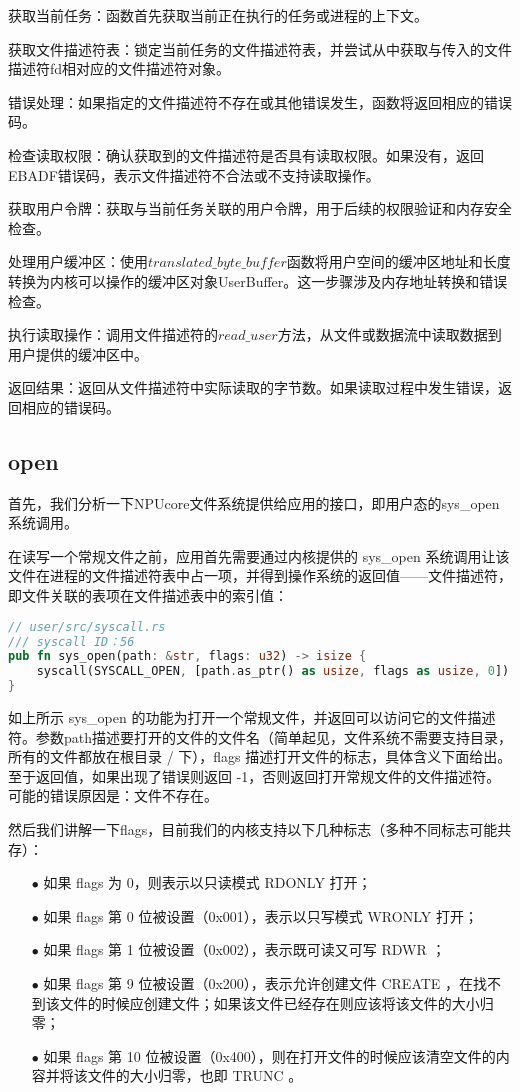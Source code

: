 获取当前任务：函数首先获取当前正在执行的任务或进程的上下文。

获取文件描述符表：锁定当前任务的文件描述符表，并尝试从中获取与传入的文件描述符fd相对应的文件描述符对象。

错误处理：如果指定的文件描述符不存在或其他错误发生，函数将返回相应的错误码。

检查读取权限：确认获取到的文件描述符是否具有读取权限。如果没有，返回EBADF错误码，表示文件描述符不合法或不支持读取操作。

获取用户令牌：获取与当前任务关联的用户令牌，用于后续的权限验证和内存安全检查。

处理用户缓冲区：使用$translated\_byte\_buffer$函数将用户空间的缓冲区地址和长度转换为内核可以操作的缓冲区对象UserBuffer。这一步骤涉及内存地址转换和错误检查。

执行读取操作：调用文件描述符的$read\_user$方法，从文件或数据流中读取数据到用户提供的缓冲区中。

返回结果：返回从文件描述符中实际读取的字节数。如果读取过程中发生错误，返回相应的错误码。

\subsection{open}
首先，我们分析一下NPUcore文件系统提供给应用的接口，即用户态的sys_open 系统调用。

在读写一个常规文件之前，应用首先需要通过内核提供的 sys_open 系统调用让该文件在进程的文件描述符表中占一项，并得到操作系统的返回值——文件描述符，即文件关联的表项在文件描述表中的索引值：
\begin{lstlisting}[language=rust]
// user/src/syscall.rs
/// syscall ID：56
pub fn sys_open(path: &str, flags: u32) -> isize {
	syscall(SYSCALL_OPEN, [path.as_ptr() as usize, flags as usize, 0])
}
\end{lstlisting}

如上所示 sys_open 的功能为打开一个常规文件，并返回可以访问它的文件描述符。参数path描述要打开的文件的文件名（简单起见，文件系统不需要支持目录，所有的文件都放在根目录 / 下），flags 描述打开文件的标志，具体含义下面给出。至于返回值，如果出现了错误则返回 -1，否则返回打开常规文件的文件描述符。可能的错误原因是：文件不存在。

然后我们讲解一下flags，目前我们的内核支持以下几种标志（多种不同标志可能共存）：
\begin{itemize}
\item [$\bullet$]
如果 flags 为 0，则表示以只读模式 RDONLY 打开；
\item [$\bullet$]
如果 flags 第 0 位被设置（0x001），表示以只写模式 WRONLY 打开；
\item [$\bullet$]
如果 flags 第 1 位被设置（0x002），表示既可读又可写 RDWR ；
\item [$\bullet$]
如果 flags 第 9 位被设置（0x200），表示允许创建文件 CREATE ，在找不到该文件的时候应创建文件；如果该文件已经存在则应该将该文件的大小归零；
\item [$\bullet$]
如果 flags 第 10 位被设置（0x400），则在打开文件的时候应该清空文件的内容并将该文件的大小归零，也即 TRUNC 。
\end{itemize}

